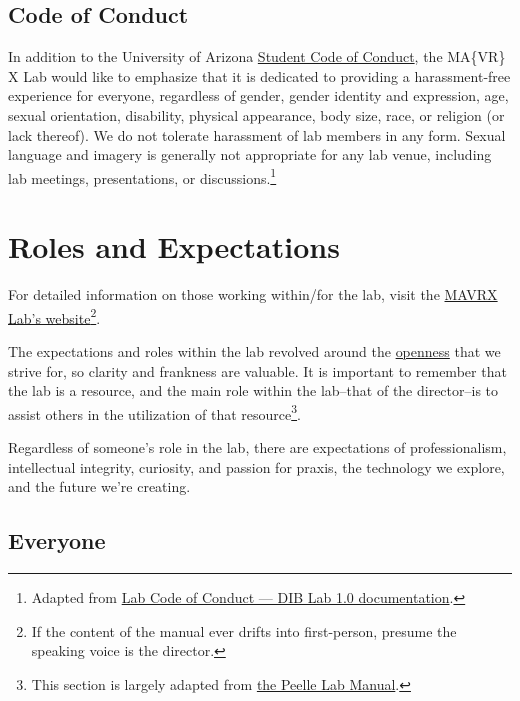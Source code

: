 \documentclass[]{tufte-book}
\begin{document}
\hypertarget{code-of-conduct}{%
\section*{Code of Conduct}\label{code-of-conduct}}

In addition to the University of Arizona \href{https://deanofstudents.arizona.edu/student-rights-responsibilities/student-code-conduct}{Student Code of Conduct}, the MA\{VR\} X Lab would like to emphasize that it is dedicated to providing a harassment-free experience for everyone, regardless of gender, gender identity and expression, age, sexual orientation, disability, physical appearance, body size, race, or religion (or lack thereof). We do not tolerate harassment of lab members in any form. Sexual language and imagery is generally not appropriate for any lab venue, including lab meetings, presentations, or discussions.\footnote{Adapted from \href{http://ivory.idyll.org/lab/coc.html}{Lab Code of Conduct --- DIB Lab 1.0 documentation}.}

\hypertarget{roles}{%
\chapter{Roles and Expectations}\label{roles}}

For detailed information on those working within/for the lab, visit the \href{https://mavrxlab.org/people}{MAVRX Lab's website}\footnote{If the content of the manual ever drifts into first-person, presume the speaking voice is the director.}.

The expectations and roles within the lab revolved around the \protect\hyperlink{openness}{openness} that we strive for, so clarity and frankness are valuable. It is important to remember that the lab is a resource, and the main role within the lab--that of the director--is to assist others in the utilization of that resource\footnote{This section is largely adapted from \href{https://github.com/jpeelle/peellelab_manual/blob/master/peellelab_manual.pdf}{the Peelle Lab Manual}.}.

Regardless of someone's role in the lab, there are expectations of professionalism, intellectual integrity, curiosity, and passion for praxis, the technology we explore, and the future we're creating.

\hypertarget{everyone}{%
\section{Everyone}\label{everyone}}
\end{document}
